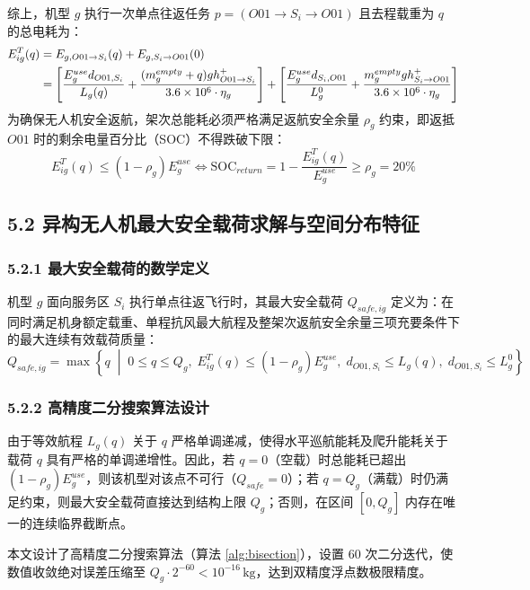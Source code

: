 \documentclass[12pt,a4paper,UTF8]{ctexart}
\begin{document}
综上，机型 $g$ 执行一次单点往返任务 $p = (O01 \to S_i \to O01)$ 且去程载重为 $q$ 的总电耗为：
\begin{align}
E_{ig}^T(q) &= E_{g, O01 \to S_i}(q) + E_{g, S_i \to O01}(0) \notag \\
&= \left[ \frac{E_g^{use} d_{O01, S_i}}{L_g(q)} + \frac{(m_g^{empty} + q) g h_{O01 \to S_i}^+}{3.6 \times 10^6 \cdot \eta_g} \right] + \left[ \frac{E_g^{use} d_{S_i, O01}}{L_g^0} + \frac{m_g^{empty} g h_{S_i \to O01}^+}{3.6 \times 10^6 \cdot \eta_g} \right]
\end{align}
为确保无人机安全返航，架次总能耗必须严格满足返航安全余量 $\rho_g$ 约束，即返抵 $O01$ 时的剩余电量百分比（SOC）不得跌破下限：
\begin{equation}
E_{ig}^T(q) \le (1 - \rho_g) E_g^{use} \iff \text{SOC}_{return} = 1 - \frac{E_{ig}^T(q)}{E_g^{use}} \ge \rho_g = 20\%
\end{equation}

\subsection{5.2 异构无人机最大安全载荷求解与空间分布特征}

\subsubsection{5.2.1 最大安全载荷的数学定义}
机型 $g$ 面向服务区 $S_i$ 执行单点往返飞行时，其最大安全载荷 $Q_{safe, ig}$ 定义为：在同时满足机身额定载重、单程抗风最大航程及整架次返航安全余量三项充要条件下的最大连续有效载荷质量：
\begin{equation}
Q_{safe, ig} = \max \left\{ q \;\middle|\; 0 \le q \le Q_g, \; E_{ig}^T(q) \le (1 - \rho_g) E_g^{use}, \; d_{O01, S_i} \le L_g(q), \; d_{O01, S_i} \le L_g^0 \right\}
\end{equation}

\subsubsection{5.2.2 高精度二分搜索算法设计}
由于等效航程 $L_g(q)$ 关于 $q$ 严格单调递减，使得水平巡航能耗及爬升能耗关于载荷 $q$ 具有严格的单调递增性。因此，若 $q=0$（空载）时总能耗已超出 $(1-\rho_g)E_g^{use}$，则该机型对该点不可行（$Q_{safe}=0$）；若 $q=Q_g$（满载）时仍满足约束，则最大安全载荷直接达到结构上限 $Q_g$；否则，在区间 $[0, Q_g]$ 内存在唯一的连续临界截断点。

本文设计了高精度二分搜索算法（算法 \ref{alg:bisection}），设置 $60$ 次二分迭代，使数值收敛绝对误差压缩至 $Q_g \cdot 2^{-60} < 10^{-16}\,\text{kg}$，达到双精度浮点数极限精度。
\end{document}
